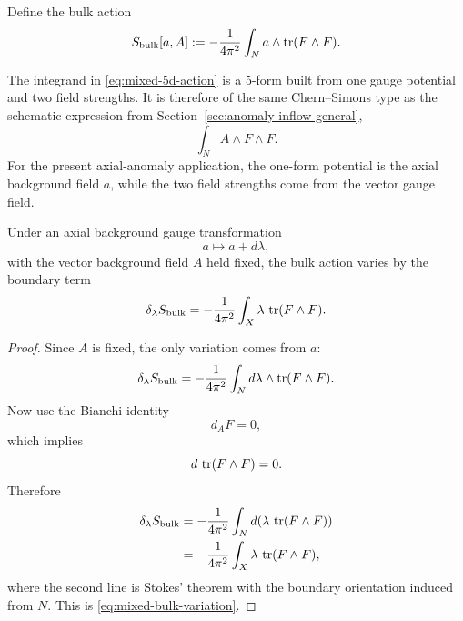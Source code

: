 \begin{definition}\label{def:mixed-5d-inflow}
Define the bulk action
\begin{equation}\label{eq:mixed-5d-action}
S_{\mathrm{bulk}}[a,A]
:=
-\frac{1}{4\pi^2}\int_N a\wedge \operatorname{tr}(F\wedge F).
\end{equation}
\end{definition}

\begin{remark}\label{rem:mixed-cs-type}
The integrand in \eqref{eq:mixed-5d-action} is a $5$-form built from one gauge potential and two field strengths. It is therefore of the same Chern--Simons type as the schematic expression from Section~\ref{sec:anomaly-inflow-general},
\begin{equation*}
\int_N A\wedge F\wedge F.
\end{equation*}
For the present axial-anomaly application, the one-form potential is the axial background field $a$, while the two field strengths come from the vector gauge field.
\end{remark}

\begin{proposition}\label{prop:mixed-bulk-variation}
Under an axial background gauge transformation
\begin{equation}\label{eq:axial-gauge-transform}
a\longmapsto a+d\lambda,
\end{equation}
with the vector background field $A$ held fixed, the bulk action varies by the boundary term
\begin{equation}\label{eq:mixed-bulk-variation}
\delta_\lambda S_{\mathrm{bulk}}
=
-\frac{1}{4\pi^2}\int_X \lambda\,\operatorname{tr}(F\wedge F).
\end{equation}
\end{proposition}

\begin{proof}
Since $A$ is fixed, the only variation comes from $a$:
\begin{equation*}
\delta_\lambda S_{\mathrm{bulk}}
=
-\frac{1}{4\pi^2}\int_N d\lambda\wedge \operatorname{tr}(F\wedge F).
\end{equation*}
Now use the Bianchi identity
\begin{equation*}
d_A F = 0,
\end{equation*}
which implies
\begin{equation*}
d\,\operatorname{tr}(F\wedge F)=0.
\end{equation*}
Therefore
\begin{align*}
\delta_\lambda S_{\mathrm{bulk}}
&=
-\frac{1}{4\pi^2}\int_N d\!\left(\lambda\,\operatorname{tr}(F\wedge F)\right) \\
&=
-\frac{1}{4\pi^2}\int_X \lambda\,\operatorname{tr}(F\wedge F),
\end{align*}
where the second line is Stokes' theorem with the boundary orientation induced from $N$. This is \eqref{eq:mixed-bulk-variation}.
\end{proof}

